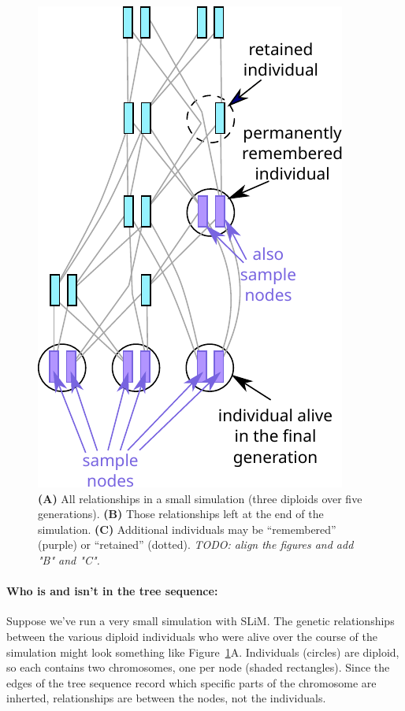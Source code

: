 \documentclass[12pt]{article}
\newcommand{\comment}[1]{\textit{\color{green} #1}}
\begin{document}
\begin{figure}
    \includegraphics{figures/pedigree_remember}
\caption{
    \textbf{(A)} All relationships in a small simulation
    (three diploids over five generations).
    \textbf{(B)} Those relationships left at the end of the simulation.
    \textbf{(C)} Additional individuals may be ``remembered'' (purple)
        or ``retained'' (dotted).
    \comment{TODO: align the figures and add "B" and "C".}
}
\label{fig:indivs}
\end{figure}

\paragraph{Who is and isn't in the tree sequence:}
Suppose we've run a very small simulation with SLiM.
The genetic relationships between
the various diploid individuals who were alive over the course of the simulation might
look something like Figure~\ref{fig:indivs}A.
Individuals (circles) are diploid,
so each contains two chromosomes, one per node (shaded rectangles).
Since the edges of the tree sequence record
which specific parts of the chromosome are inherted,
relationships are between the nodes, not the individuals.
\end{document}
